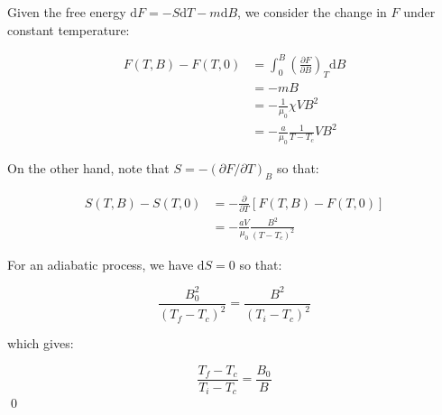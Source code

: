 \documentclass[12pt]{article}
\begin{document}
Given the free energy $\mathrm{d}F = -S\mathrm{d}T - m\mathrm{d}B$, we consider the change in $F$ under constant temperature:

\begin{equation}
    \begin{split}
        F(T, B) - F(T, 0) &= \int_{0}^{B} \left( \frac{\partial F}{\partial B} \right)_{T} \mathrm{d}B \\
        &= -mB \\
        &= -\frac{1}{\mu_{0}} \chi V B^{2} \\
        &= -\frac{a}{\mu_{0}} \frac{1}{T - T_{c}} V B^{2}
    \end{split}
\end{equation}

On the other hand, note that $S = -(\partial F/\partial T)_{B}$ so that:

\begin{equation}
    \begin{split}
        S(T, B) - S(T, 0) &= -\frac{\partial }{\partial T} \left[ F(T, B) - F(T, 0) \right] \\
        &= -\frac{aV}{\mu_{0}} \frac{B^{2}}{(T - T_{c})^{2}}
    \end{split}
\end{equation}

For an adiabatic process, we have $\mathrm{d}S = 0$ so that:

\begin{equation}
    \frac{B_{0}^{2}}{(T_{f} - T_{c})^{2}} = \frac{B^{2}}{(T_{i} - T_{c})^{2}}
\end{equation}

which gives:

\begin{equation}
    \frac{T_{f} - T_{c}}{T_{i} - T_{c}} = \frac{B_{0}}{B}
\end{equation}
\qed


\end{document}
